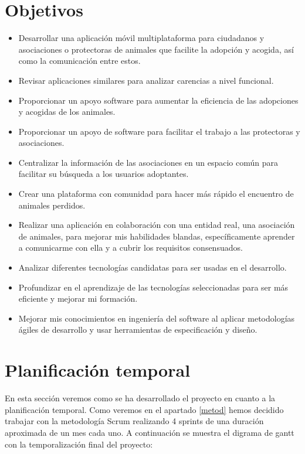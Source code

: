 \section{Objetivos}

\begin{itemize}
	\item Desarrollar una aplicación móvil multiplataforma para ciudadanos y asociaciones o protectoras de animales que facilite la adopción y acogida, así como la comunicación entre estos. %
	\item Revisar aplicaciones similares para analizar carencias a nivel funcional. %
	\item Proporcionar un apoyo software para aumentar la eficiencia de las adopciones y acogidas de los animales. %
	\item Proporcionar un apoyo de software para facilitar el trabajo a las protectoras y asociaciones.
	\item Centralizar la información de las asociaciones en un espacio común para facilitar su búsqueda a los usuarios adoptantes.
	\item Crear una plataforma con comunidad para hacer más rápido el encuentro de animales perdidos.
	\item Realizar una aplicación en colaboración con una entidad real, una asociación de animales, para mejorar mis habilidades blandas, específicamente aprender a comunicarme con ella y a cubrir los requisitos consensuados.
	\item Analizar diferentes tecnologías candidatas para ser usadas en el desarrollo.
	\item Profundizar en el aprendizaje de las tecnologías seleccionadas para ser más eficiente y mejorar mi formación.
	\item Mejorar mis conocimientos en ingeniería del software al aplicar metodologías ágiles de desarrollo y usar herramientas de especificación y diseño.
	
\end{itemize}

\section{Planificación temporal}
En esta sección veremos como se ha desarrollado el proyecto en cuanto a la planificación temporal. Como veremos en el apartado \ref{metod} hemos decidido trabajar con la metodología Scrum realizando 4 sprints de una duración aproximada de un mes cada uno. A continuación se muestra el digrama de gantt con la temporalización final del proyecto:

